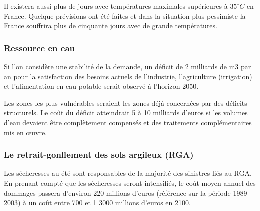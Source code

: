 \documentclass[a4paper,11pt]{article}
\begin{document}
Il  existera aussi  plus  de  jours avec  températures  maximales supérieures  à
$35^{\circ}C$ en France. Quelque prévisions
ont été faites et dans la situation plus pessimiste la France souffrira plus
de cinquante jours avec de grande températures. 





\subsubsection*{Ressource en eau}
Si l’on considère une stabilité de la demande, un déficit de 2 milliards de m3
par an  pour la satisfaction  des besoins actuels de  l’industrie, l’agriculture
(irrigation) et l’alimentation en eau potable serait observé à l’horizon 2050.

Les zones les plus vulnérables seraient les zones déjà concernées par des déficits structurels. Le coût
du déficit atteindrait 5 à 10 milliards d’euros si les volumes d’eau devaient être
complètement compensés et des traitements complémentaires mis en œuvre.

\subsubsection*{Le retrait-gonflement des sols argileux (RGA)}

Les sécheresses au été sont responsables de la majorité des sinistres liés au RGA.
En prenant compté  que les sécheresses seront intensifiés,  le coût moyen annuel
des dommages  passera d’environ 220  millions d’euros (référence sur  la période
1989-2003) à un coût entre 700 et 1 3000 millions d’euros en 2100.
\end{document}
